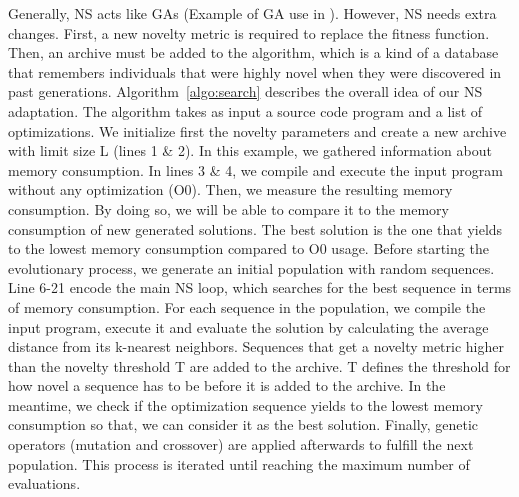 Generally, NS acts like GAs (Example of GA use in  \cite{cooper2002adaptive}). However, NS needs extra changes. First, a new novelty metric is required to replace the fitness function. Then, an archive must be added to the algorithm, which is a kind of a database that remembers individuals that were highly novel when they were discovered in past generations. 
Algorithm~\ref{algo:search} describes the overall idea of our NS adaptation. The algorithm takes as input a source code program and a list of optimizations. We initialize first the novelty parameters and create a new archive with limit size L (lines 1 \& 2). In this example, we gathered information about memory consumption. In lines 3 \& 4, we compile and execute the input program without any optimization (O0). Then, we measure the resulting memory consumption. By doing so, we will be able to compare it to the memory consumption of new generated solutions. The best solution is the one that yields to the lowest memory consumption compared to O0 usage.
Before starting the evolutionary process, we generate an initial population with random sequences. Line 6-21 encode the main NS loop, which searches for the best sequence in terms of memory consumption. For each sequence in the population, we compile the input program, execute it and evaluate the solution by calculating the average distance from its k-nearest neighbors. Sequences that get a novelty metric higher than the novelty threshold T are added to the archive. T defines the threshold for how novel a sequence has to be before it is added to the archive. In the meantime, we check if the optimization sequence yields to the lowest memory consumption so that, we can consider it as the best solution. Finally, genetic operators
(mutation and crossover) are applied afterwards to fulfill the next population. This process is iterated until reaching the maximum number of evaluations.


